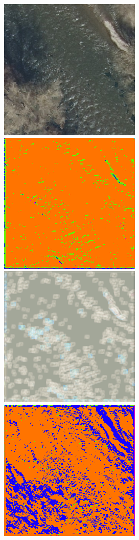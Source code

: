 \begin{figure}
    \vspace{2mm}
    \includegraphics[width=\WnetPredictionsImageWidth]{images/wnet/original/224817-image} \hfill
    \includegraphics[width=\WnetPredictionsImageWidth]{images/wnet/36d-6/224817-prediction} \hfill
    \includegraphics[width=\WnetPredictionsImageWidth]{images/wnet/36d-6/224817-restored} \hfill
    \includegraphics[width=\WnetPredictionsImageWidth]{images/wnet/46d-6/224817-prediction} \hfill

\end{figure}
